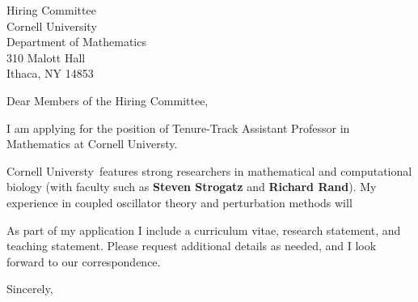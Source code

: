 \documentclass[11pt,a4paper]{letter}
\begin{document}
\def\School{Cornell Universty}
\begin{letter}
{Hiring Committee\\
Cornell University\\
Department of Mathematics\\
310 Malott Hall\\
Ithaca, NY 14853}


\opening{Dear Members of the Hiring Committee,}

I am applying for the position of Tenure-Track Assistant Professor in Mathematics at \School. 



\School~features strong researchers in mathematical and computational biology (with faculty such as \textbf{Steven Strogatz} and \textbf{Richard Rand}). My experience in coupled oscillator theory and perturbation methods will 



As part of my application I include a curriculum vitae, research statement, and teaching statement. Please request additional details as needed, and I look forward to our correspondence.

\closing{Sincerely,}
\end{letter}
\end{document}
